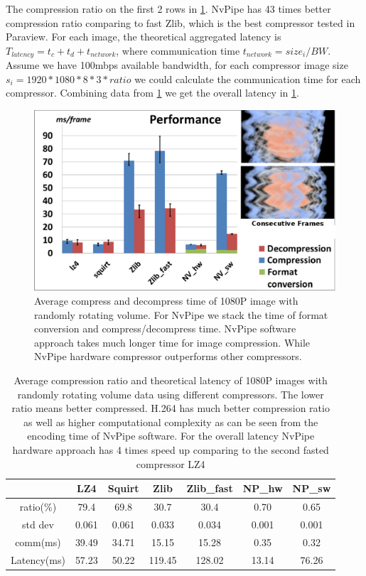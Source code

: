 \documentclass{vgtc}                          %
\begin{document}
The compression ratio on the first 2 rows in \cref{tab:latency}. NvPipe has 43 times better compression ratio comparing to fast Zlib, which is the best compressor tested in Paraview.
For each image, the theoretical aggregated latency is \(T_{latency}=t_c+t_d+t_{network}\), where communication time \(t_{network}=size_{i}/{BW}\). 
Assume we have 100mbps available bandwidth, for each compressor image size \(s_i=1920*1080*8*3*{ratio}\) we could calculate the communication time for each compressor. Combining data from \cref{fig:time} we get the overall latency in \cref{tab:latency}.

\begin{figure}[t]
  \centering
  \includegraphics[width=\columnwidth]{Performance.eps}
  \caption{ Average compress and decompress time of 1080P image with randomly rotating volume. For NvPipe we stack the time of format conversion and compress/decompress time. NvPipe software approach takes much longer time for image compression. While NvPipe hardware compressor outperforms other compressors.}
  \label{fig:time}
\end{figure}

\begin{table}[htb]
  \caption{Average compression ratio and theoretical latency of 1080P images with randomly rotating volume data using different compressors. The lower ratio means better compressed. H.264 has much better compression ratio as well as higher computational complexity as can be seen from the encoding time of NvPipe software. For the overall latency NvPipe hardware approach has 4 times speed up comparing to the second fasted compressor LZ4}
  \label{tab:latency}
  \scriptsize
  \begin{center}
    \begin{tabular}{ccccccc}
      & LZ4 & Squirt & Zlib & Zlib\_fast & NP\_hw & NP\_sw \\
    \hline
      ratio(\%) & 79.4 & 69.8 & 30.7 & 30.4 & 0.70 & 0.65 \\
      std dev & 0.061 & 0.061 & 0.033 & 0.034 & 0.001 & 0.001\\
      comm(ms) & 39.49 & 34.71 & 15.15 & 15.28 & 0.35 & 0.32 \\
      Latency(ms) & 57.23 & 50.22 & 119.45 & 128.02 & 13.14 & 76.26
    \end{tabular}
  \end{center}
\end{table}
\end{document}
